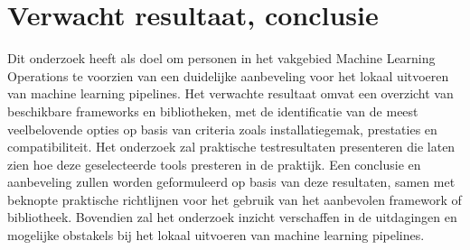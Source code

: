 


\section{Verwacht resultaat, conclusie}%
\label{sec:verwachte_resultaten}
Dit onderzoek heeft als doel om personen in het vakgebied Machine Learning Operations te voorzien van een duidelijke aanbeveling voor het lokaal uitvoeren van machine learning pipelines. Het verwachte resultaat omvat een overzicht van beschikbare frameworks en bibliotheken, met de identificatie van de meest veelbelovende opties op basis van criteria zoals installatiegemak, prestaties en compatibiliteit. Het onderzoek zal praktische testresultaten presenteren die laten zien hoe deze geselecteerde tools presteren in de praktijk. Een conclusie en aanbeveling zullen worden geformuleerd op basis van deze resultaten, samen met beknopte praktische richtlijnen voor het gebruik van het aanbevolen framework of bibliotheek. Bovendien zal het onderzoek inzicht verschaffen in de uitdagingen en mogelijke obstakels bij het lokaal uitvoeren van machine learning pipelines.



